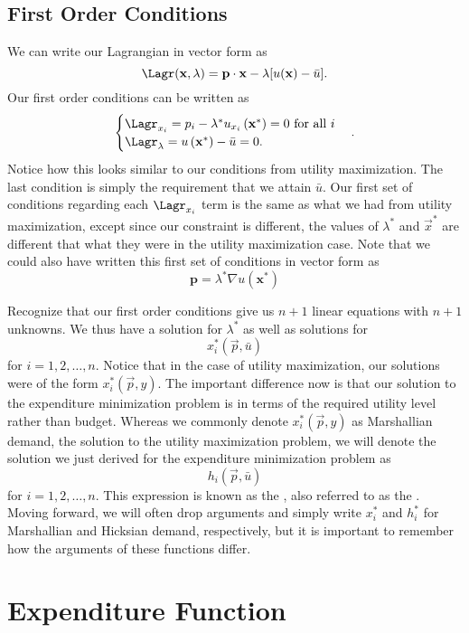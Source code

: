 \subsection*{First Order Conditions}

We can write our Lagrangian in vector form as
$$\Lagr(\mathbf{x}, \lambda)=\mathbf{p} \cdot \mathbf{x} - \lambda[u(\mathbf{x}) - \bar{u}].$$
Our first order conditions can be written as 
$$
\begin{cases}
\Lagr_{x_{i}}=p_{i}-\lambda^{*} u_{x_{i}}\left(\mathbf{x}^{*}\right)=0 \text { for all } i \\
\Lagr_{\lambda}=u\left(\mathbf{x}^{*}\right) - \bar{u}=0.
\end{cases}.$$
Notice how this looks similar to our conditions from utility maximization. The last condition is simply the requirement that we attain $\bar{u}$. Our first set of conditions regarding each $\Lagr_{x_{i}}$ term is the same as what we had from utility maximization, except since our constraint is different, the values of $\lambda^*$ and $\vec{x}^*$ are different that what they were in the utility maximization case. Note that we could also have written this first set of conditions in vector form as
$$\mathbf{p}=\lambda^{*} \nabla u\left(\mathbf{x}^{*}\right)$$

Recognize that our first order conditions give us $n+1$ linear equations with $n+1$ unknowns. We thus have a solution for $\lambda^*$ as well as solutions for
$$x_i^*(\vec{p}, \bar{u})$$
for $i = 1, 2, \ldots, n$. Notice that in the case of utility maximization, our solutions were of the form $x_i^*(\vec{p}, y)$. The important difference now is that our solution to the expenditure minimization problem is in terms of the required utility level rather than budget. Whereas we commonly denote $x_i^*(\vec{p}, y)$ as Marshallian demand, the solution to the utility maximization problem, we will denote the solution we just derived for the expenditure minimization problem as 
$$h_i(\vec{p}, \bar{u})$$
for $i=1, 2, \ldots, n$. This expression is known as the , also referred to as the . Moving forward, we will often drop arguments and simply write $x_i^*$ and $h_i^*$ for Marshallian and Hicksian demand, respectively, but it is important to remember how the arguments of these functions differ.

\section{Expenditure Function}

